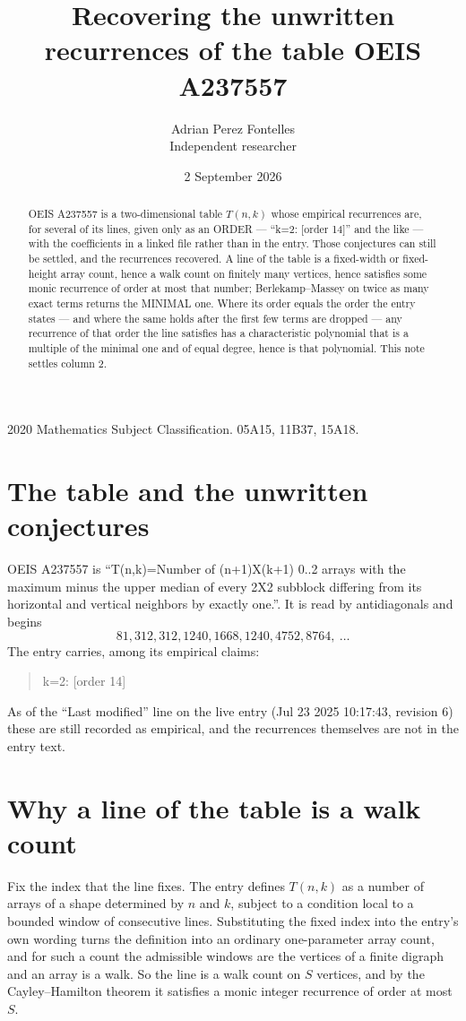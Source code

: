 \documentclass[11pt,a4paper]{article}
\title{Recovering the unwritten recurrences of the table OEIS A237557}
\author{Adrian Perez Fontelles\\ \small Independent researcher}
\date{2 September 2026}
\theoremstyle{plain}
\theoremstyle{definition}
\begin{document}
\maketitle

\begin{abstract}
OEIS A237557 is a two-dimensional table $T(n,k)$ whose empirical recurrences are, for several of
its lines, given only as an ORDER --- ``k=2: [order 14]'' and the like --- with the
coefficients in a linked file rather than in the entry. Those conjectures can still be settled,
and the recurrences recovered. A line of the table is a fixed-width or fixed-height array
count, hence a walk count on finitely many vertices, hence satisfies some monic recurrence of
order at most that number; Berlekamp--Massey on twice as many exact terms returns the MINIMAL
one. Where its order equals the order the entry states --- and where the same holds after the
first few terms are dropped --- any recurrence of that order the line satisfies has a
characteristic polynomial that is a multiple of the minimal one and of equal degree, hence is
that polynomial. This note settles column 2.
\end{abstract}

\noindent\small 2020 Mathematics Subject Classification. 05A15, 11B37, 15A18.\normalsize

\section{The table and the unwritten conjectures}

OEIS A237557 is ``T(n,k)=Number of (n+1)X(k+1) 0..2 arrays with the maximum minus the upper median of every 2X2 subblock differing from its horizontal and vertical neighbors by exactly one.''. It is read by antidiagonals and begins
\[
81, 312, 312, 1240, 1668, 1240, 4752, 8764,\ \dots
\]
The entry carries, among its empirical claims:
\begin{quote}\small
k=2: [order 14]
\end{quote}
As of the ``Last modified'' line on the live entry (Jul 23 2025 10:17:43, revision 6) these are still
recorded as empirical, and the recurrences themselves are not in the entry text.

\section{Why a line of the table is a walk count}

Fix the index that the line fixes. The entry defines $T(n,k)$ as a number of arrays of a shape
determined by $n$ and $k$, subject to a condition local to a bounded window of consecutive
lines. Substituting the fixed index into the entry's own wording turns the definition into an
ordinary one-parameter array count, and for such a count the admissible windows are the
vertices of a finite digraph and an array is a walk. So the line is a walk count on $S$
vertices, and by the Cayley--Hamilton theorem it satisfies a monic integer recurrence of order
at most $S$.
\end{document}
